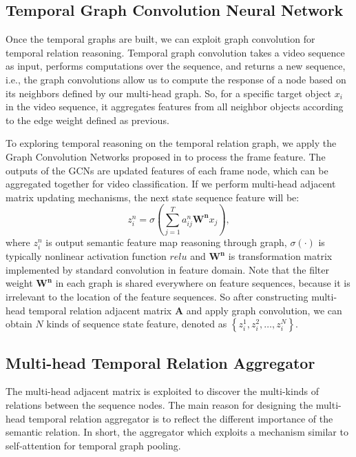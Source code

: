 \documentclass[conference,compsoc]{IEEEtran}
\begin{document}
\subsection{Temporal Graph Convolution Neural Network}
    Once the temporal graphs are built, we can exploit graph convolution for temporal relation reasoning. Temporal graph convolution takes a video sequence as input, performs computations over the sequence, and returns a new sequence, i.e., the graph convolutions allow us to compute the response of a node based on its neighbors deﬁned by our multi-head graph. So, for a specific target object $x_{i}$ in the video sequence, it aggregates features from all neighbor objects according to the edge weight defined as previous. 

    To exploring temporal reasoning on the temporal relation graph, we apply the Graph Convolution Networks proposed in \cite{velickovic2018graph} to process the frame feature. The outputs of the GCNs are updated features of each frame node, which can be aggregated together for video classification. If we perform multi-head adjacent matrix updating mechanisms, the next state sequence feature will be:
    \begin{equation}
        z_{i}^{n} = \sigma\left( \sum_{j=1}^{T}a_{ij}^{n}\mathbf{W^{n}}x_j\right),
        \label{equ:node_feature}
    \end{equation}
    where $z_{i}^{n}$ is output semantic feature map reasoning through graph, $\sigma\left( \cdot \right)$ is typically nonlinear activation function $relu$ and $\mathbf{W^{n}}$ is transformation matrix implemented by standard convolution in feature domain. Note that the filter weight $\mathbf{W^{n}}$ in each graph is shared everywhere on feature sequences, because it is irrelevant to the location of the feature sequences. So after constructing multi-head temporal relation adjacent matrix $\mathbf{A}$ and apply graph convolution, we can obtain $N$ kinds of sequence state feature, denoted as $\left\{ z_{i}^{1}, z_{i}^{2}, \ldots, z_{i}^{N} \right\}$.


\subsection{Multi-head Temporal Relation Aggregator}
    The multi-head adjacent matrix is exploited to discover the multi-kinds of relations between the sequence nodes. The main reason for designing the multi-head temporal relation aggregator is to reflect the different importance of the semantic relation. In short, the aggregator which exploits a mechanism similar to self-attention for temporal graph pooling. 
\end{document}

